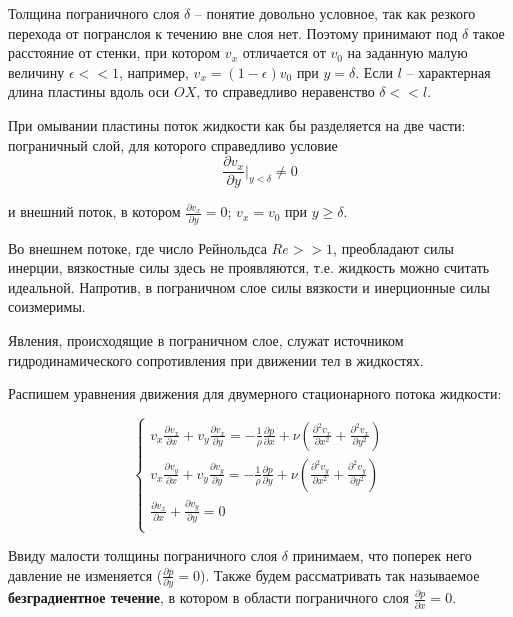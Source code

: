 Толщина пограничного слоя $\delta$ – понятие довольно условное, так как резкого перехода от погранслоя к течению вне слоя
нет. Поэтому принимают под $\delta$ такое расстояние от стенки, при котором $v_x$ отличается от $v_0$ на заданную малую величину $\epsilon << 1$, например, $v_x = (1-\epsilon)v_0$ при $y=\delta$. Если $l$ – характерная длина пластины вдоль оси $OX$, то справедливо неравенство $\delta << l$.

\bigskip
При омывании пластины поток жидкости как бы разделяется на две части: пограничный слой, для которого справедливо условие
$$\frac{\partial v_x}{\partial y}\Big|_{y<\delta} \neq 0$$

и внешний поток, в котором $\frac{\partial v_x}{\partial y} = 0$; $v_x = v_0$ при $y \geq \delta$.

\bigskip
Во внешнем потоке, где число Рейнольдса $Re >> 1$, преобладают силы инерции, вязкостные силы здесь не проявляются, т.е. жидкость можно считать идеальной. Напротив, в пограничном слое силы вязкости и инерционные силы соизмеримы.

Явления, происходящие в пограничном слое, служат источником гидродинамического сопротивления при движении тел в жидкостях.

\bigskip
Распишем уравнения движения для двумерного стационарного потока жидкости:

\begin{equation}
    \begin{cases}
        v_x\frac{\partial v_x}{\partial x} + v_y\frac{\partial v_x}{\partial y} = -\frac{1}{\rho} \frac{\partial p}{\partial x} + \nu (\frac{\partial^2 v_x}{\partial x^2} + \frac{\partial^2 v_x}{\partial y^2})\\

        v_x\frac{\partial v_y}{\partial x} + v_y\frac{\partial v_y}{\partial y} = -\frac{1}{\rho} \frac{\partial p}{\partial y} + \nu (\frac{\partial^2 v_y}{\partial x^2} + \frac{\partial^2 v_y}{\partial y^2})\\

        \frac{\partial v_x}{\partial x} + \frac{\partial v_y}{\partial y} = 0\\
    \end{cases}
\end{equation}

Ввиду малости толщины пограничного слоя $\delta$ принимаем, что поперек него давление не изменяется ($\frac{\partial p}{\partial y} = 0$). Также будем рассматривать так называемое \textbf{безградиентное течение}, в котором в области пограничного слоя $\frac{\partial p}{\partial x} = 0$.

